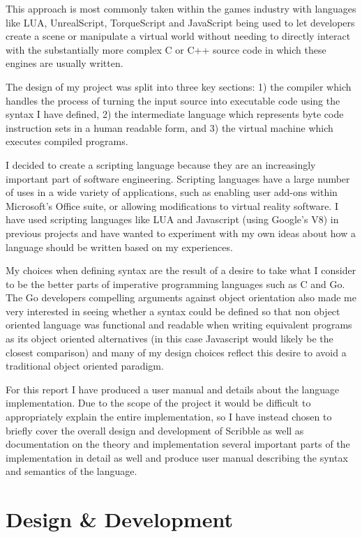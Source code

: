 \documentclass[]{final_report}
\begin{document}
This approach is most commonly taken within the games industry with languages like LUA, UnrealScript, TorqueScript and JavaScript being used to let developers create a scene or manipulate a virtual world without needing to directly interact with the substantially more complex C or C++ source code in which these engines are usually written.

The design of my project was split into three key sections: 1) the compiler which handles the process of turning the input source into executable code using the syntax I have defined, 2) the intermediate language which represents byte code instruction sets in a human readable form, and 3) the virtual machine which executes compiled programs.

I decided to create a scripting language because they are an increasingly important part of software engineering. Scripting languages have a large number of uses in a wide variety of applications, such as enabling user add-ons within Microsoft's Office suite, or allowing modifications to virtual reality software. I have used scripting languages like LUA and Javascript (using Google's V8) in previous projects and have wanted to experiment with my own ideas about how a language should be written based on my experiences. 

My choices when defining syntax are the result of a desire to take what I consider to be the better parts of imperative programming languages such as C and Go. The Go developers compelling arguments against object orientation also made me very interested in seeing whether a syntax could be defined so that non object oriented language was functional and readable when writing equivalent programs as its object oriented alternatives (in this case Javascript would likely be the closest comparison) and many of my design choices reflect this desire to avoid a traditional object oriented paradigm.

For this report I have produced a user manual and details about the language implementation. Due to the scope of the project it would be difficult to appropriately explain the entire implementation, so I have instead chosen to briefly cover the overall design and development of Scribble as well as documentation on the theory and implementation several important parts of the implementation in detail as well and produce user manual describing the syntax and semantics of the language.

\chapter{Design \& Development}
\end{document}
